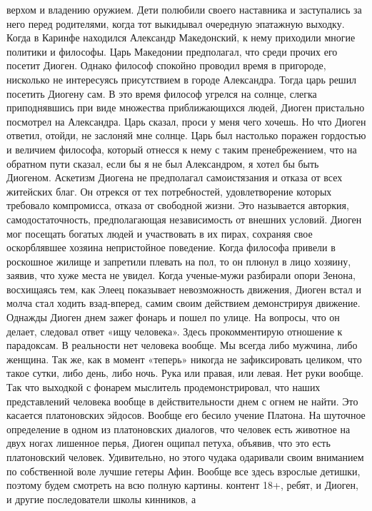 верхом и владению оружием. Дети полюбили своего наставника и заступались за него
перед родителями, когда тот выкидывал очередную эпатажную выходку. Когда в
Каринфе находился Александр Македонский, к нему приходили многие политики и
философы. Царь Македонии предполагал, что среди прочих его посетит Диоген.
Однако философ спокойно проводил время в пригороде, нисколько не интересуясь
присутствием в городе Александра. Тогда царь решил посетить Диогену сам. В это
время философ угрелся на солнце, слегка приподнявшись при виде множества
приближающихся людей, Диоген пристально посмотрел на Александра. Царь сказал,
проси у меня чего хочешь. Но что Диоген ответил, отойди, не заслоняй мне солнце.
Царь был настолько поражен гордостью и величием философа, который отнесся к нему
с таким пренебрежением, что на обратном пути сказал, если бы я не был
Александром, я хотел бы быть Диогеном. Аскетизм Диогена не предполагал
самоистязания и отказа от всех житейских благ. Он отрекся от тех потребностей,
удовлетворение которых требовало компромисса, отказа от свободной жизни. Это
называется авторкия, самодостаточность, предполагающая независимость от внешних
условий. Диоген мог посещать богатых людей и участвовать в их пирах, сохраняя
свое оскорблявшее хозяина непристойное поведение. Когда философа привели в
роскошное жилище и запретили плевать на пол, то он плюнул в лицо хозяину,
заявив, что хуже места не увидел. Когда ученые-мужи разбирали опори Зенона,
восхищаясь тем, как Элеец показывает невозможность движения, Диоген встал и
молча стал ходить взад-вперед, самим своим действием демонстрируя движение.
Однажды Диоген днем зажег фонарь и пошел по улице. На вопросы, что он делает,
следовал ответ «ищу человека». Здесь прокомментирую отношение к парадоксам. В
реальности нет человека вообще. Мы всегда либо мужчина, либо женщина. Так же,
как в момент «теперь» никогда не зафиксировать целиком, что такое сутки, либо
день, либо ночь. Рука или правая, или левая. Нет руки вообще. Так что выходкой с
фонарем мыслитель продемонстрировал, что наших представлений человека вообще в
действительности днем с огнем не найти. Это касается платоновских эйдосов.
Вообще его бесило учение Платона. На шуточное определение в одном из
платоновских диалогов, что человек есть животное на двух ногах лишенное перья,
Диоген ощипал петуха, объявив, что это есть платоновский человек. Удивительно,
но этого чудака одаривали своим вниманием по собственной воле лучшие гетеры
Афин. Вообще все здесь взрослые детишки, поэтому будем смотреть на всю полную
картины. контент 18+, ребят, и Диоген, и другие последователи школы кинников, а
